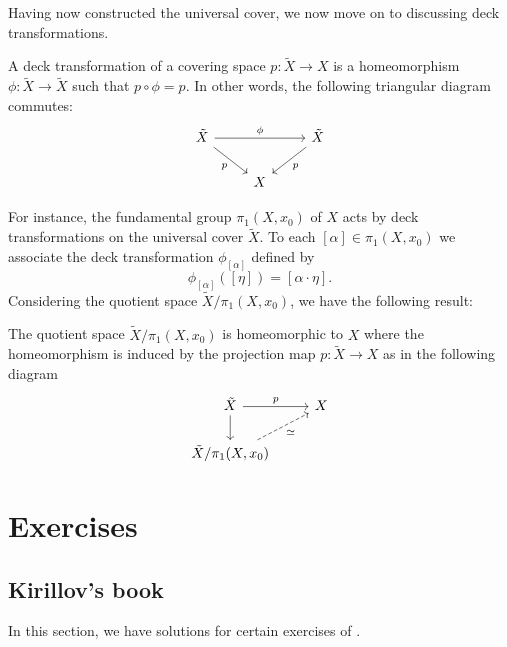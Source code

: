 \documentclass{report}
\begin{document}
Having now constructed the universal cover, we now move on to discussing deck transformations.
\begin{definition}
    A deck transformation of a covering space $p: \tilde X \to X$ is a homeomorphism $\phi: \tilde X \to \tilde X$ such that $p \circ \phi = p$.
    In other words, the following triangular diagram commutes:
    \[
    \begin{tikzcd}
        \tilde X \arrow[rr, "\phi"] \arrow[rd, "p"'] & & \tilde X \arrow[ld, "p"] \\
        & X &
    \end{tikzcd}
    \]
\end{definition}
For instance, the fundamental group $\pi_1(X, x_0)$ of $X$ acts by deck transformations on the universal cover $\tilde X$.
To each $[\alpha] \in \pi_1(X, x_0)$ we associate the deck transformation $\phi_{[\alpha]}$ defined by
\[
\phi_{[\alpha]}([\eta]) = [\alpha \cdot \eta].
\]
Considering the quotient space $\tilde X / \pi_1(X, x_0)$, we have the following result:
\begin{theorem}
    The quotient space $\tilde X / \pi_1(X, x_0)$ is homeomorphic to $X$ where the homeomorphism is induced by the projection map $p: \tilde X \to X$ as in the following diagram
    \[
    \begin{tikzcd}
        \tilde X \arrow[r, "p"] \arrow[d] & X \\
        \tilde X / \pi_1(X, x_0) \arrow[ur, "\simeq"', dashed]
    \end{tikzcd}
    \]
\end{theorem}

\chapter{Exercises}

\section{Kirillov's book}
In this section, we have solutions for certain exercises of \cite{kirillov2008introduction}.
\end{document}
